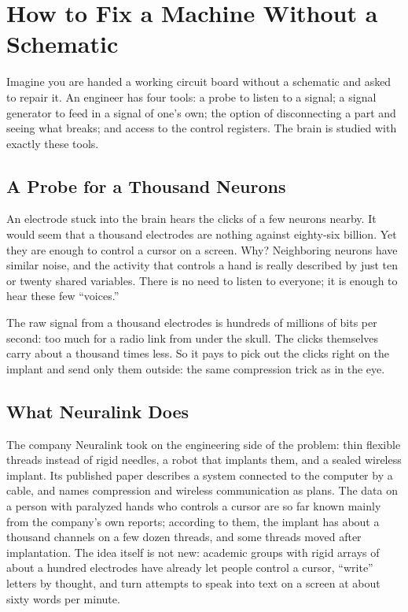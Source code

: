 \chapter{How to Fix a Machine Without a Schematic}


Imagine you are handed a working circuit board without a schematic and asked to repair it. An engineer has four tools: a probe to listen to a signal; a signal generator to feed in a signal of one's own; the option of disconnecting a part and seeing what breaks; and access to the control registers. The brain is studied with exactly these tools.

\section*{A Probe for a Thousand Neurons}

An electrode stuck into the brain hears the clicks of a few neurons nearby. It would seem that a thousand electrodes are nothing against eighty-six billion. Yet they are enough to control a cursor on a screen. Why? Neighboring neurons have similar noise, and the activity that controls a hand is really described by just ten or twenty shared variables. There is no need to listen to everyone; it is enough to hear these few ``voices.''

The raw signal from a thousand electrodes is hundreds of millions of bits per second: too much for a radio link from under the skull. The clicks themselves carry about a thousand times less. So it pays to pick out the clicks right on the implant and send only them outside: the same compression trick as in the eye.

\section*{What Neuralink Does}

The company Neuralink took on the engineering side of the problem: thin flexible threads instead of rigid needles, a robot that implants them, and a sealed wireless implant. Its published paper describes a system connected to the computer by a cable, and names compression and wireless communication as plans. The data on a person with paralyzed hands who controls a cursor are so far known mainly from the company's own reports; according to them, the implant has about a thousand channels on a few dozen threads, and some threads moved after implantation. The idea itself is not new: academic groups with rigid arrays of about a hundred electrodes have already let people control a cursor, ``write'' letters by thought, and turn attempts to speak into text on a screen at about sixty words per minute.

